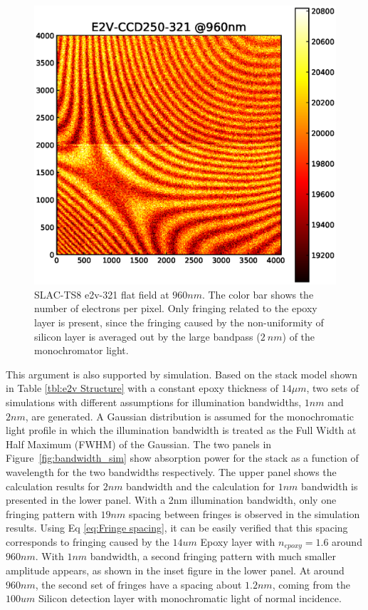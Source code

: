 \documentclass[twocolumn]{aastex63} %
\begin{document}
\begin{CJK*}{UTF8}{gbsn}
\begin{figure}[t]
\centering
\includegraphics[scale = 0.45]{E2V-321-960nm.eps}
\caption{SLAC-TS8 e2v-321 flat field at $960nm$. The color bar shows the number of electrons per pixel. Only fringing related to the epoxy layer is present, since the fringing caused by the non-uniformity of silicon layer is averaged out by the large bandpass ($2\ nm$) of the monochromator light.}
\label{fig:e2v_example}
\end{figure}
This argument is also supported by simulation. Based on the stack model shown in Table \ref{tbl:e2v Structure} with a constant epoxy thickness of $14\mu m$, two sets of simulations with different assumptions for illumination bandwidths, $1nm$ and $2nm$, are generated. A Gaussian distribution is assumed for the monochromatic light profile in which the illumination bandwidth is treated as the Full Width at Half Maximum (FWHM) of the Gaussian. The two panels in Figure~\ref{fig:bandwidth_sim} show absorption power for the stack as a function of wavelength for the two bandwidths respectively. The upper panel shows the calculation results for $2nm$ bandwidth and the calculation for $1nm$ bandwidth is presented in the lower panel. With a 2nm illumination bandwidth, only one fringing pattern with $19nm$ spacing between fringes is observed in the simulation results. Using Eq \ref{eq:Fringe spacing}, it can be easily verified that this spacing corresponds to fringing caused by the $14um$ Epoxy layer with $n_{epoxy} = 1.6$ around $960nm$. With $1nm$ bandwidth, a second fringing pattern with much smaller amplitude appears, as shown in the inset figure in the lower panel. At around $960nm$, the second set of fringes have a spacing about $1.2nm$, coming from the $100um$ Silicon detection layer with monochromatic light of normal incidence.


\end{CJK*}
\end{document}
